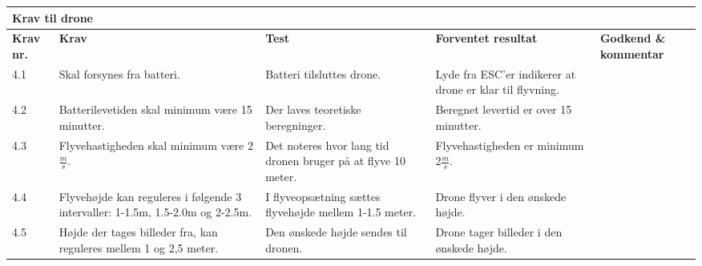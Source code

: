     \centering
    \begin{tabular}{|p{}|p{3.2 cm}|p{3.2 cm}|p{3.2 cm}|p{2.2 cm}|}
			\hline
			\multicolumn{5}{|l|}{\textbf{{\large Krav til drone}}}\\ \hline
			\textbf{Krav nr.} & \textbf{Krav} & \textbf{Test} & \textbf{Forventet \newline resultat} & 			
			\textbf{Godkend \& \newline kommentar} \\ \hline
			
			4.1 & Skal forsynes fra batteri.
				& Batteri tilsluttes drone.
				& Lyde fra ESC'er indikerer at drone er klar til flyvning.
				& \\ \hline

			4.2 & Batterilevetiden skal minimum være 15 minutter.
				& Der laves teoretiske beregninger.
				& Beregnet levertid er over 15 minutter.
				&  \\ \hline
			
			4.3 & Flyvehastigheden skal minimum være 2$\frac{m}{s}$.
				& Det noteres hvor lang tid dronen bruger på at flyve 10 meter.
				& Flyvehastigheden er minimum 2$\frac{m}{s}$.
				& \\ \hline		
				
			4.4 & Flyvehøjde kan reguleres i følgende 3 intervaller: 1-1.5m, 1.5-2.0m og 2-2.5m.
				& I flyveopsætning sættes flyvehøjde mellem 1-1.5 meter.
				& Drone flyver i den ønskede højde.
				& \\ \hline	
				
			4.5 & Højde der tages billeder fra, kan reguleres mellem 1 og 2,5 meter.
				& Den ønskede højde sendes til dronen.
				& Drone tager billeder i den ønskede højde.
				& \\ \hline	
		\end{tabular}
	\label{tab:krav_1}

\vspace{2cm}

